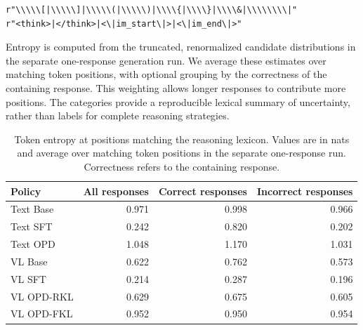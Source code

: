 \documentclass[]{jingdong}
\theoremstyle{plain}
\theoremstyle{definition}
\theoremstyle{remark}
\begin{document}
\begin{minipage}{\linewidth}
\begin{verbatim}
r"\\\\\[|\\\\\]|\\\\\(|\\\\\)|\\\\{|\\\\}|\\\\&|\\\\\\\\|"
r"<think>|</think>|<\|im_start\|>|<\|im_end\|>"
\end{verbatim}
\end{minipage}\par


Entropy is computed from the truncated, renormalized candidate distributions in the separate one-response generation run. We average these estimates over matching token positions, with optional grouping by the correctness of the containing response. This weighting allows longer responses to contribute more positions. The categories provide a reproducible lexical summary of uncertainty, rather than labels for complete reasoning strategies.

\begin{table}[H]
\centering
\small
\caption{Token entropy at positions matching the reasoning lexicon. Values are in nats and average over matching token positions in the separate one-response run. Correctness refers to the containing response.}
\label{tab:app-breadth}
\setlength{\tabcolsep}{4pt}
\renewcommand{\arraystretch}{1.08}
\begin{tabular*}{\linewidth}{@{\extracolsep{\fill}}lrrr@{}}
\toprule
Policy & All responses & Correct responses & Incorrect responses \\
\midrule
Text Base & 0.971 & 0.998 & 0.966 \\
Text SFT & 0.242 & 0.820 & 0.202 \\
Text OPD & 1.048 & 1.170 & 1.031 \\
\midrule
VL Base & 0.622 & 0.762 & 0.573 \\
VL SFT & 0.214 & 0.287 & 0.196 \\
VL OPD-RKL & 0.629 & 0.675 & 0.605 \\
VL OPD-FKL & 0.952 & 0.950 & 0.954 \\
\bottomrule
\end{tabular*}
\end{table}
\end{document}

